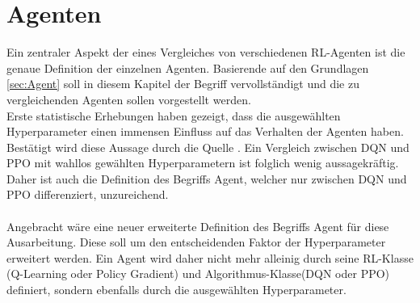 \chapter{Agenten} \label{chap:Agenten}
Ein zentraler Aspekt der eines Vergleiches von verschiedenen RL-Agenten ist die genaue Definition der einzelnen Agenten. Basierende auf den Grundlagen \ref{sec:Agent} soll in diesem Kapitel der Begriff vervollständigt und die zu vergleichenden Agenten sollen vorgestellt werden.\\
Erste statistische Erhebungen haben gezeigt, dass die ausgewählten Hyperparameter einen immensen Einfluss auf das Verhalten der Agenten haben. Bestätigt wird diese Aussage durch die Quelle \cite{Sutton1998}. Ein Vergleich zwischen DQN und PPO mit wahllos gewählten Hyperparametern ist folglich wenig aussagekräftig. Daher ist auch die Definition des Begriffs Agent, welcher nur zwischen DQN und PPO differenziert, unzureichend.\\
\\Angebracht wäre eine neuer erweiterte Definition des Begriffs Agent für diese Ausarbeitung. Diese soll um den entscheidenden Faktor der Hyperparameter erweitert werden. Ein Agent wird daher nicht mehr alleinig durch seine RL-Klasse (Q-Learning oder Policy Gradient) und Algorithmus-Klasse(DQN oder PPO) definiert, sondern ebenfalls durch die ausgewählten Hyperparameter.

